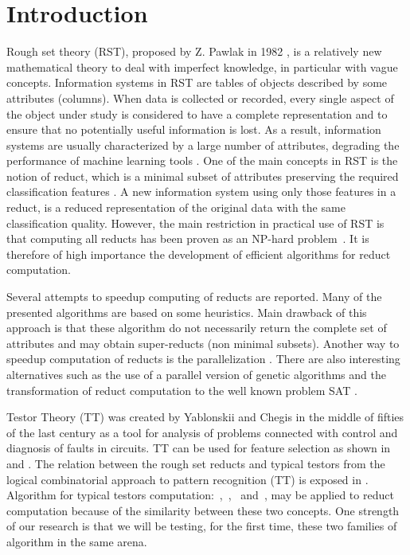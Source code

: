 \documentclass[authoryear,11pt]{elsarticle}
\begin{document}
\section{Introduction}
  Rough set theory (RST), proposed by Z. Pawlak in 1982 \citep{Pawlak81,Pawlak81-2,Pawlak82,Pawlak91}, 
  is a relatively new mathematical theory 
  to deal with imperfect knowledge, in particular with vague concepts. Information systems in RST 
  are tables of objects described by some attributes (columns). 
  When data is collected or recorded, every single aspect of the object under study is considered 
  to have a complete representation and to ensure that no potentially useful information is lost.
  As a result, information systems are usually characterized by a large number of attributes,
  degrading the performance of machine learning tools \citep{Parthalain08}.
  One of the main concepts in RST is the notion of reduct, which is a minimal subset of attributes 
  preserving the required classification features \citep{Pawlak91}. A new information system using 
  only those features in a reduct, is a reduced representation of the original data with the same 
  classification quality. 
  However, the main restriction in practical use of RST is that computing all reducts has been proven 
  as an NP-hard problem~\citep{Skowron92}.
  It is therefore of high importance the development of efficient algorithms for reduct computation.
  
  Several attempts to speedup computing of reducts are reported. Many of the presented algorithms are 
  based on some heuristics. Main drawback of this approach is that these algorithm do not necessarily 
  return the complete set of attributes and may obtain super-reducts (non minimal subsets). Another 
  way to speedup computation of reducts is the parallelization \citep{Strakowski08}. There are also 
  interesting alternatives such as the use of a parallel version of genetic algorithms \citep{Wroblewski98}
  and the transformation of reduct computation to the well known problem SAT \citep{Jensen14}.
  
  Testor Theory (TT) was created by Yablonskii and Chegis in the middle of fifties 
  of the last century as a tool for analysis of problems connected with control and 
  diagnosis of faults in circuits. TT can be used for feature selection as shown in~\citep{Ruiz08}
  and \citep{Martinez01}. The relation between the rough set reducts and typical testors from the
  logical combinatorial approach to pattern recognition (TT) is exposed in \citep{Lazo15}. Algorithm for
  typical testors computation:~\citep{Ruiz85},~\citep{Santiesteban03},~\citep{Sanchez07} and~\citep{Lias09},
  may be applied to reduct computation because of the similarity between these two concepts. One strength 
  of our research is that we will be testing, for the first time, these two families of algorithm in the 
  same arena.
  
\end{document}
